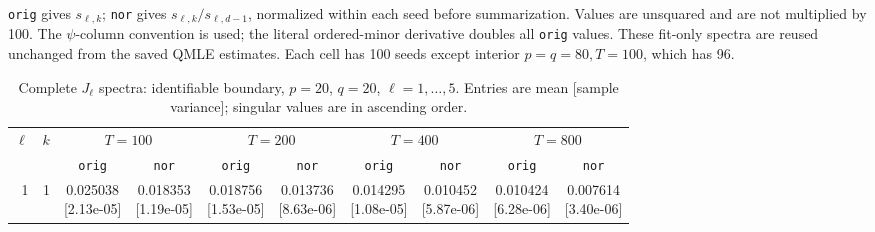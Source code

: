 \documentclass[12pt,letterpaper]{article}
\def\spacingset#1{\renewcommand{\baselinestretch}{#1}\small\normalsize}
\theoremstyle{plain}
\theoremstyle{definition}
\begin{document}
\begin{table}[p]
\begin{adjustbox}{max width=\linewidth}
\begin{tabular}{@{}rr*{8}{c}@{}}
\bottomrule
\end{tabular}
\end{adjustbox}
\par\smallskip
\begin{minipage}{0.98\linewidth}\footnotesize
\texttt{orig} gives $s_{\ell,k}$; \texttt{nor} gives $s_{\ell,k}/s_{\ell,d-1}$, normalized within each seed before summarization. Values are unsquared and are not multiplied by 100. The $\psi$-column convention is used; the literal ordered-minor derivative doubles all \texttt{orig} values. These fit-only spectra are reused unchanged from the saved QMLE estimates. Each cell has 100 seeds except interior $p=q=80,T=100$, which has 96.
\end{minipage}
\endgroup
\end{table}
\clearpage
\begin{table}[p]
\begingroup
\spacingset{1.0}
\small\centering
\caption{Complete $J_\ell$ spectra: identifiable boundary, $p=20$, $q=20$, $\ell=1,\ldots,5$. Entries are mean [sample variance]; singular values are in ascending order.}
\label{s23:lambda:alltab:spectra:p20q20boundary:1-5}
\footnotesize
\setlength{\tabcolsep}{2.2pt}
\renewcommand{\arraystretch}{1.03}
\begin{adjustbox}{max width=\linewidth}
\begin{tabular}{@{}rr*{8}{c}@{}}
\toprule
$\ell$ & $k$ & \multicolumn{2}{c}{$T=100$} & \multicolumn{2}{c}{$T=200$} & \multicolumn{2}{c}{$T=400$} & \multicolumn{2}{c}{$T=800$}\\
\cmidrule(lr){3-4}\cmidrule(lr){5-6}\cmidrule(lr){7-8}\cmidrule(lr){9-10}
 &  & \texttt{orig} & \texttt{nor} & \texttt{orig} & \texttt{nor} & \texttt{orig} & \texttt{nor} & \texttt{orig} & \texttt{nor}\\
\midrule
1 & 1 & \shortstack{0.025038\\[-1pt]{\scriptsize[2.13e-05]}} & \shortstack{0.018353\\[-1pt]{\scriptsize[1.19e-05]}} & \shortstack{0.018756\\[-1pt]{\scriptsize[1.53e-05]}} & \shortstack{0.013736\\[-1pt]{\scriptsize[8.63e-06]}} & \shortstack{0.014295\\[-1pt]{\scriptsize[1.08e-05]}} & \shortstack{0.010452\\[-1pt]{\scriptsize[5.87e-06]}} & \shortstack{0.010424\\[-1pt]{\scriptsize[6.28e-06]}} & \shortstack{0.007614\\[-1pt]{\scriptsize[3.40e-06]}}\\

\end{tabular}
\end{adjustbox}
\end{table}
\end{document}
